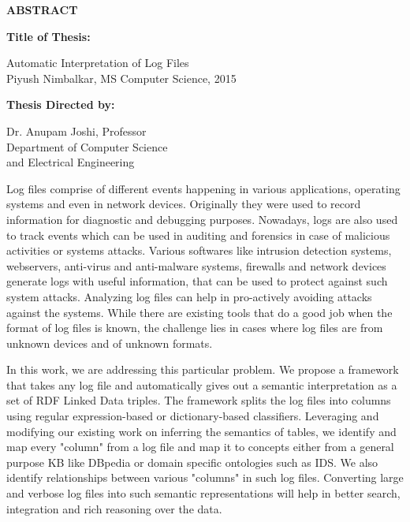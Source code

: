\newpage
\pagestyle{empty}

\begin{center}
\vspace{0.1in}
\large{\bf ABSTRACT} \par  
\bigskip \bigskip
\end{center}

{\bf Title of Thesis:} \parbox[t]{4.5in}{{Automatic Interpretation of Log Files\\
Piyush Nimbalkar, MS Computer Science, 2015\\}}
\begin{singlespace}
{\bf Thesis Directed by:}{\hspace{2.5mm}} \parbox[t]{3in}{Dr. Anupam Joshi, Professor\\
Department of Computer Science\\ 
and Electrical Engineering\\}
\end{singlespace}

Log files comprise of different events happening in various applications, operating systems and even in network devices. Originally they were used to record information for diagnostic and debugging purposes. Nowadays, logs are also used to track events which can be used in auditing and forensics in case of malicious activities or systems attacks. Various softwares like intrusion detection systems, webservers, anti-virus and anti-malware systems, firewalls and network devices generate logs with useful information, that can be used to protect against such system attacks. Analyzing log files can help in pro-actively avoiding attacks against the systems. While there are existing tools that do a good job when the format of log files is known, the challenge lies in cases where log files are from unknown devices and of unknown formats.

In this work, we are addressing this particular problem. We propose a framework that takes any log file and automatically gives out a semantic interpretation as a set of RDF Linked Data triples. The framework splits the log files into columns using regular expression-based or dictionary-based classifiers. Leveraging and modifying our existing work on inferring the semantics of tables, we identify and map every "column" from a log file and map it to concepts either from a general purpose KB like DBpedia or domain specific ontologies such as IDS. We also identify relationships between various "columns" in such log files. Converting large and verbose log files into such semantic representations will help in better search, integration and rich reasoning over the data.

\par\vfil

